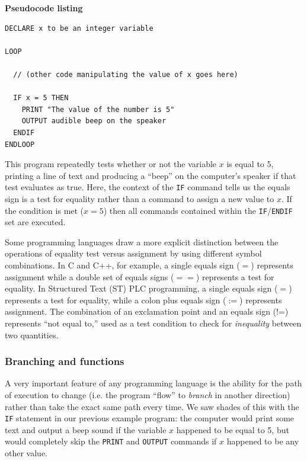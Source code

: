 \vskip 10pt

\textbf{Pseudocode listing}

\lstset{language=pseudocode}
\begin{lstlisting}
DECLARE x to be an integer variable

LOOP
 
  // (other code manipulating the value of x goes here)

  IF x = 5 THEN 
    PRINT "The value of the number is 5"
    OUTPUT audible beep on the speaker
  ENDIF
ENDLOOP
\end{lstlisting}

\vskip 10pt

This program repeatedly tests whether or not the variable $x$ is equal to 5, printing a line of text and producing a ``beep'' on the computer's speaker if that test evaluates as true.  Here, the context of the \texttt{IF} command tells us the equals sign is a test for equality rather than a command to assign a new value to $x$.  If the condition is met ($x = 5$) then all commands contained within the \texttt{IF}/\texttt{ENDIF} set are executed.

Some programming languages draw a more explicit distinction between the operations of equality test versus assignment by using different symbol combinations.  In C and C++, for example, a single equals sign ($=$) represents assignment while a double set of equals signs ($==$) represents a test for equality.  In Structured Text (ST) PLC programming, a single equals sign ($=$) represents a test for equality, while a colon plus equals sign ($:=$) represents assignment.  The combination of an exclamation point and an equals sign (!=) represents ``not equal to,'' used as a test condition to check for \textit{inequality} between two quantities.



\filbreak
\subsubsection{Branching and functions}

A very important feature of any programming language is the ability for the path of execution to change (i.e. the program ``flow'' to \textit{branch} in another direction) rather than take the exact same path every time.  We saw shades of this with the \texttt{IF} statement in our previous example program: the computer would print some text and output a beep sound if the variable $x$ happened to be equal to 5, but would completely skip the \texttt{PRINT} and \texttt{OUTPUT} commands if $x$ happened to be any other value.  

